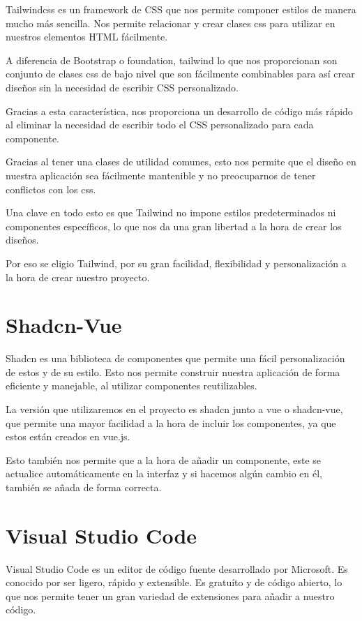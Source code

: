 Tailwindcss es un framework de CSS que nos permite componer estilos de manera mucho más sencilla. Nos permite relacionar y crear clases css para utilizar en nuestros elementos HTML fácilmente.
	
A diferencia de Bootstrap o foundation, tailwind lo que nos proporcionan son conjunto de clases css de bajo nivel que son fácilmente combinables para así crear diseños sin la necesidad de escribir CSS personalizado.
	
Gracias a esta característica, nos proporciona un desarrollo de código más rápido al eliminar la necesidad de escribir todo el CSS personalizado para cada componente. 
	
Gracias al tener una clases de utilidad comunes, esto nos permite que el diseño en nuestra aplicación sea fácilmente mantenible y no preocuparnos de tener conflictos con los css.
	
Una clave en todo esto es que Tailwind no impone estilos predeterminados ni componentes específicos, lo que nos da una gran libertad a la hora de crear los diseños.
	
Por eso se eligio Tailwind, por su gran facilidad, flexibilidad y personalización a la hora de crear nuestro proyecto. 

\section{Shadcn-Vue}

Shadcn es una biblioteca de componentes que permite una fácil personalización de estos y de su estilo. Esto nos permite construir nuestra aplicación de forma eficiente y manejable, al utilizar componentes reutilizables.
	
La versión que utilizaremos en el proyecto es shadcn junto a vue o shadcn-vue, que permite una mayor facilidad a la hora de incluir los componentes, ya que estos están creados en vue.js.

Esto también nos permite que a la hora de añadir un componente, este se actualice automáticamente en la interfaz y si hacemos algún cambio en él, también se añada de forma correcta. 

\section{Visual Studio Code}

Visual Studio Code es un editor de código fuente desarrollado por Microsoft. Es conocido por ser ligero, rápido y extensible. Es gratuíto y de código abierto, lo que nos permite tener un gran variedad de extensiones para añadir a nuestro código.
	
